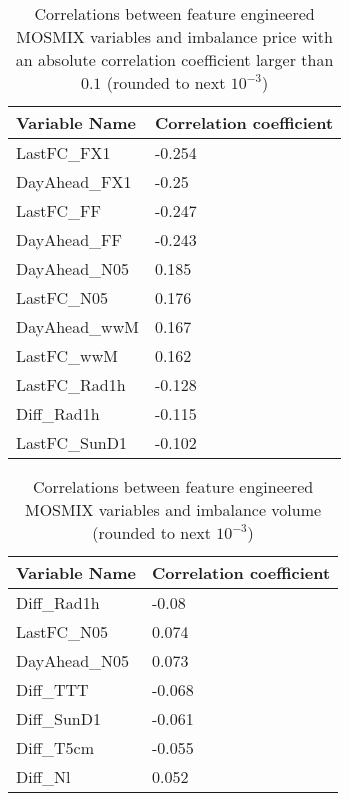 \documentclass[class=scrbook, crop=false]{standalone}
\begin{document}
    \begin{table}
    \centering
    \begin{tabular}{l|l}
    Variable Name	& Correlation coefficient \\\hline
   	LastFC\_FX1	&-0.254\\
	DayAhead\_FX1	&-0.25\\
	LastFC\_FF		&-0.247\\
	DayAhead\_FF 	&-0.243\\
	DayAhead\_N05	&0.185\\
	LastFC\_N05	&0.176\\
	DayAhead\_wwM	&0.167\\
	LastFC\_wwM	&0.162\\
	LastFC\_Rad1h 	&-0.128\\
	Diff\_Rad1h          	&-0.115\\
	LastFC\_SunD1     	&-0.102\\
    \end{tabular}
    
    \caption{Correlations between feature engineered MOSMIX variables and imbalance price with an absolute correlation coefficient larger than $0.1$ (rounded to next $10^{-3}$)}
    \label{Table::imbalance_price_MOSMIX_correlations}
    \end{table}
    
    \begin{table}
    \centering
    \begin{tabular}{l|l}
    Variable Name	& Correlation coefficient \\\hline
	Diff\_Rad1h                          &-0.08\\
	LastFC\_N05                          &0.074\\
	DayAhead\_N05                        &0.073\\
	Diff\_TTT                           &-0.068\\
	Diff\_SunD1                         &-0.061\\
	Diff\_T5cm                          &-0.055\\
	Diff\_Nl                             &0.052\\
    \end{tabular}
    
    \caption{Correlations between feature engineered MOSMIX variables and imbalance volume (rounded to next $10^{-3}$)}
    \label{Table::imbalance_volume_MOSMIX_correlations}
    \end{table}
    
\end{document}
